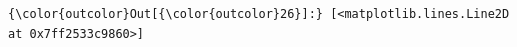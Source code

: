 \documentclass[11pt]{article}
\begin{document}
\begin{Verbatim}[commandchars=\\\{\}]
{\color{outcolor}Out[{\color{outcolor}26}]:} [<matplotlib.lines.Line2D at 0x7ff2533c9860>]
\end{Verbatim}
            
    \begin{center}
    \end{center}
    { \hspace*{\fill} \\}
    

    
    
    
    
\end{document}
